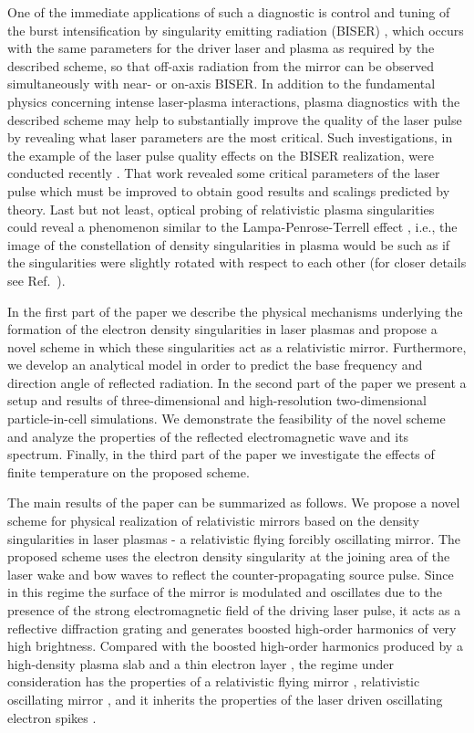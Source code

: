 \documentclass[10pt, a4paper, twoside, openright]{report}
\begin{document}
One of the immediate applications of such a diagnostic is control and tuning of the burst intensification by singularity emitting radiation (BISER) \cite{Pirozhkov2012, Pirozhkov2014, Pirozhkov2017, Sagisaka2020}, which occurs with the same parameters for the driver laser and plasma as required by the described scheme, so that off-axis radiation from the mirror can be observed simultaneously with near- or on-axis BISER. In addition to the fundamental physics concerning intense laser-plasma interactions, plasma diagnostics with the described scheme may help to substantially improve the quality of the laser pulse by revealing what laser parameters are the most critical. Such investigations, in the example of the laser pulse quality effects on the BISER realization, were conducted recently \cite{Pirozhkov2018}. That work revealed some critical parameters of the laser pulse which must be improved to obtain good results and scalings predicted by theory. Last but not least, optical probing of relativistic plasma singularities could reveal a phenomenon similar to the Lampa-Penrose-Terrell effect \cite{Lampa1924, Penrose1959, Terrell1959}, i.e., the image of the constellation of density singularities in plasma would be such as if the singularities were slightly rotated with respect to each other (for closer details see Ref.~).

In the first part of the paper we describe the physical mechanisms underlying the formation of the electron density singularities in laser plasmas and propose a novel scheme in which these singularities act as a relativistic mirror. Furthermore, we develop an analytical model in order to predict the base frequency and direction angle of reflected radiation. In the second part of the paper we present a setup and results of three-dimensional and high-resolution two-dimensional particle-in-cell simulations. We demonstrate the feasibility of the novel scheme and analyze the properties of the reflected electromagnetic wave and its spectrum. Finally, in the third part of the paper we investigate the effects of finite temperature on the proposed scheme.

The main results of the paper can be summarized as follows. We propose a novel scheme for physical realization of relativistic mirrors based on the density singularities in laser plasmas - a relativistic flying forcibly oscillating mirror. The proposed scheme uses the electron density singularity at the joining area of the laser wake and bow waves to reflect the counter-propagating source pulse. Since in this regime the surface of the mirror is modulated and oscillates due to the presence of the strong electromagnetic field of the driving laser pulse, it acts as a reflective diffraction grating and generates boosted high-order harmonics of very high brightness. Compared with the boosted high-order harmonics produced by a high-density plasma slab and a thin electron layer \cite{Kulagin2007, Esirkepov2009, Wu2010}, the regime under consideration has the properties of a relativistic flying mirror \cite{Bulanov2003}, relativistic oscillating mirror \cite{Bulanov1994, Naumova2004}, and it inherits the properties of the laser driven oscillating electron spikes \cite{Pirozhkov2014, Pirozhkov2017}. 
\end{document}
